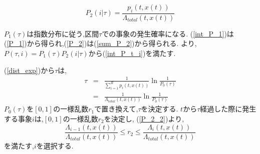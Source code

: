 \documentclass[12pt]{jsreport}
\begin{document}
\begin{equation}
P_2(i|\tau) = \frac{p_i(t,x(t))}{\Lambda_{total}(t,x(t))}
\end{equation}

$P_1(\tau)$は指数分布に従う,区間$\tau$での事象の発生確率になる.
(\ref{int_P_1})は(\ref{P_1})から得られ,(\ref{P_2})は(\ref{sum_P_2})から得られる.
より,$P(\tau,i)=P_1(\tau)P_2(i|\tau)$から(\ref{int_P_t_i})を満たす.

(\ref{dist_exp})から$\tau$は,
\begin{eqnarray}
 \tau & = & \frac{1}{\sum^{R}_{i=1} p_i(t,x(t))}\ln\frac{1}{P_0(\tau)} \\
      & = & \frac{1}{\Lambda_{total}(t,x(t))}\ln\frac{1}{P_0(\tau)}
\end{eqnarray}
$P_0(\tau)$を$[0,1]$の一様乱数$r_1$で置き換えて,$\tau$を決定する.
$t$から$\tau$経過した際に発生する事象$i$は,$[0,1]$の一様乱数$r_2$を決定し,
(\ref{P_2_2})より,
\begin{equation}
  \frac{\Lambda_{i-1}(t,x(t))}{\Lambda_{total}(t,x(t))} \leq r_2 \leq \frac{\Lambda_i(t,x(t))}{\Lambda_{total}(t,x(t))}
\end{equation}
を満たす,$i$を選択する.
\end{document}
